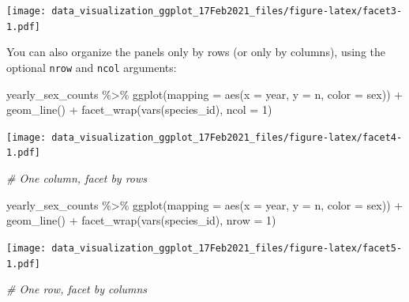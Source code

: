 \documentclass[
]{article}
\newenvironment{Shaded}{\begin{snugshade}}{\end{snugshade}}
\newcommand{\AttributeTok}[1]{\textcolor[rgb]{0.77,0.63,0.00}{#1}}
\newcommand{\CommentTok}[1]{\textcolor[rgb]{0.56,0.35,0.01}{\textit{#1}}}
\newcommand{\DecValTok}[1]{\textcolor[rgb]{0.00,0.00,0.81}{#1}}
\newcommand{\FunctionTok}[1]{\textcolor[rgb]{0.00,0.00,0.00}{#1}}
\newcommand{\NormalTok}[1]{#1}
\newcommand{\SpecialCharTok}[1]{\textcolor[rgb]{0.00,0.00,0.00}{#1}}
\begin{document}
\texttt{[image: data\_visualization\_ggplot\_17Feb2021\_files/figure-latex/facet3-1.pdf]}

You can also organize the panels only by rows (or only by columns),
using the optional \texttt{nrow} and \texttt{ncol} arguments:

\begin{Shaded}
\begin{Highlighting}[]
\NormalTok{yearly\_sex\_counts }\SpecialCharTok{\%\textgreater{}\%} 
  \FunctionTok{ggplot}\NormalTok{(}\AttributeTok{mapping =} \FunctionTok{aes}\NormalTok{(}\AttributeTok{x =}\NormalTok{ year, }\AttributeTok{y =}\NormalTok{ n, }\AttributeTok{color =}\NormalTok{ sex)) }\SpecialCharTok{+}
  \FunctionTok{geom\_line}\NormalTok{() }\SpecialCharTok{+}
  \FunctionTok{facet\_wrap}\NormalTok{(}\FunctionTok{vars}\NormalTok{(species\_id), }\AttributeTok{ncol =} \DecValTok{1}\NormalTok{)}
\end{Highlighting}
\end{Shaded}

\texttt{[image: data\_visualization\_ggplot\_17Feb2021\_files/figure-latex/facet4-1.pdf]}

\begin{Shaded}
\begin{Highlighting}[]
\CommentTok{\# One column, facet by rows}
\end{Highlighting}
\end{Shaded}

\begin{Shaded}
\begin{Highlighting}[]
\NormalTok{yearly\_sex\_counts }\SpecialCharTok{\%\textgreater{}\%} 
  \FunctionTok{ggplot}\NormalTok{(}\AttributeTok{mapping =} \FunctionTok{aes}\NormalTok{(}\AttributeTok{x =}\NormalTok{ year, }\AttributeTok{y =}\NormalTok{ n, }\AttributeTok{color =}\NormalTok{ sex)) }\SpecialCharTok{+}
  \FunctionTok{geom\_line}\NormalTok{() }\SpecialCharTok{+}
  \FunctionTok{facet\_wrap}\NormalTok{(}\FunctionTok{vars}\NormalTok{(species\_id), }\AttributeTok{nrow =} \DecValTok{1}\NormalTok{)}
\end{Highlighting}
\end{Shaded}

\texttt{[image: data\_visualization\_ggplot\_17Feb2021\_files/figure-latex/facet5-1.pdf]}

\begin{Shaded}
\begin{Highlighting}[]
\CommentTok{\# One row, facet by columns}
\end{Highlighting}
\end{Shaded}
\end{document}
